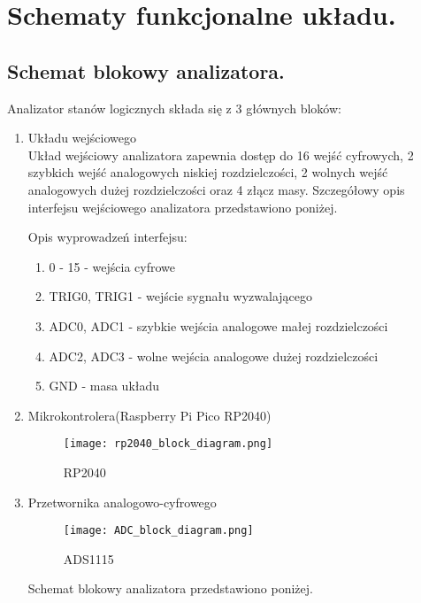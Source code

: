 \section{Schematy funkcjonalne układu.}

\subsection{Schemat blokowy analizatora.}
Analizator stanów logicznych składa się z 3 głównych bloków:
\begin{enumerate}
    \item Układu wejściowego\\
Układ wejściowy analizatora zapewnia dostęp do 16 wejść cyfrowych,
2 szybkich wejść analogowych niskiej rozdzielczości, 2 wolnych wejść
analogowych dużej rozdzielczości oraz 4 złącz masy. Szczegółowy opis 
interfejsu wejściowego analizatora przedstawiono poniżej.


Opis wyprowadzeń interfejsu:
\begin{enumerate}
    \item 0 - 15 - wejścia cyfrowe
    \item TRIG0, TRIG1 - wejście sygnału wyzwalającego
    \item ADC0, ADC1 - szybkie wejścia analogowe małej rozdzielczości
    \item ADC2, ADC3 - wolne wejścia analogowe dużej rozdzielczości
    \item GND - masa układu 
\end{enumerate} 

    \item Mikrokontrolera(Raspberry Pi Pico RP2040)
    \begin{figure}[H]
        \centering
        \texttt{[image: rp2040\_block\_diagram.png]}
        \caption{RP2040}
        \label{fig:RP2040}
    \end{figure}

    \item Przetwornika analogowo-cyfrowego 
    \begin{figure}[H]
        \centering
        \texttt{[image: ADC\_block\_diagram.png]}
        \caption{ADS1115}
        \label{fig:ADS1115}
    \end{figure}

Schemat blokowy analizatora przedstawiono poniżej.

\end{enumerate}

